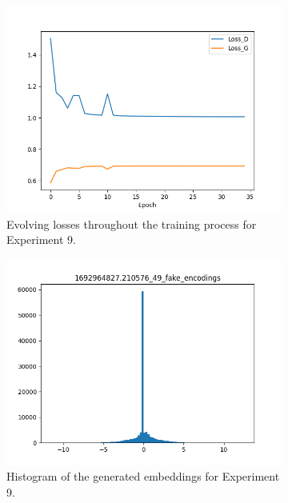 \begin{figure}[!ht]
    \centering
    \begin{subfigure}{0.3\textwidth}
        \includegraphics[width=\textwidth]{figures/4.5-results/exp9_loss.png}
        \caption{Evolving losses throughout the training process for Experiment 9.}
        \label{fig:exp9_loss}
    \end{subfigure}
    \begin{subfigure}{0.3\textwidth}
        \includegraphics[width=\textwidth]{figures/4.5-results/exp9_hist.png}
        \caption{Histogram of the generated embeddings for Experiment 9.}
        \label{fig:exp9_hist}
    \end{subfigure}
    \begin{subfigure}{0.3\textwidth}

\end{subfigure}
\end{figure}
